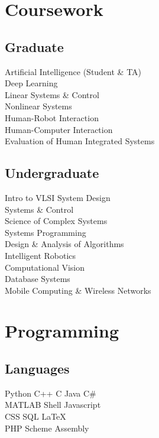 \documentclass[]{deedy-resume}
\begin{document}
\begin{minipage}[t]{0.33\textwidth}

\section{Coursework}
\subsection{Graduate}
Artificial Intelligence {\scriptsize (Student \& TA)} \\
Deep Learning \\
Linear Systems \& Control \\
Nonlinear Systems \\
Human-Robot Interaction \\
Human-Computer Interaction \\
Evaluation of Human Integrated Systems \\
\sectionsep

\subsection{Undergraduate}
Intro to VLSI System Design \\
Systems \& Control \\
Science of Complex Systems \\
Systems Programming \\
Design \& Analysis of Algorithms \\
Intelligent Robotics \\
Computational Vision \\
Database Systems \\
Mobile Computing \& Wireless Networks \\


\section{Programming}
\subsection{Languages}
Python \textbullet{} C++ \textbullet{} C \textbullet{} Java \textbullet{} C\# \\
MATLAB \textbullet{} Shell \textbullet{} Javascript \\
CSS \textbullet{} SQL \textbullet{} \LaTeX \\
PHP \textbullet{} Scheme \textbullet{} Assembly \\
\sectionsep


\end{minipage}
\end{document}
